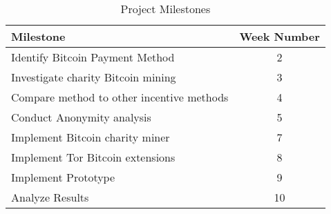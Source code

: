 \documentclass[letterpaper]{article}
\begin{document}
\begin{table}
  \centering
  \begin{tabular}{l | c}
    Milestone & Week Number\\
    \hline

    Identify Bitcoin Payment Method & 2\\
    Investigate charity Bitcoin mining & 3\\
    Compare method to other incentive methods & 4 \\
    Conduct Anonymity analysis & 5 \\
    Implement Bitcoin charity miner & 7 \\
    Implement Tor Bitcoin extensions & 8 \\
    Implement Prototype & 9 \\
    Analyze Results & 10

  \end{tabular}
  \caption{Project Milestones}
  \label{tab:milestones}
\end{table}







\end{document}
